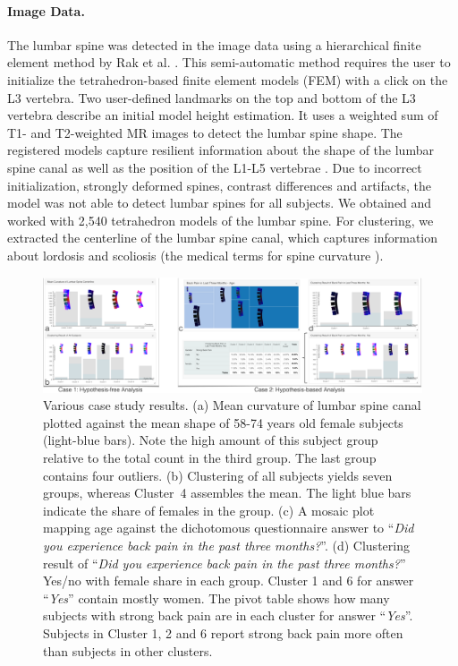 \documentclass[journal]{style/vgtc} 			          %
\begin{document}
\paragraph{Image Data.} \label{Image-Data}
The lumbar spine was detected in the image data using a hierarchical finite element method by Rak et al. \cite{Rak2013}.
%
This semi-automatic method requires the user to initialize the tetrahedron-based finite element models (FEM) with a click on the L3 vertebra.
%
Two user-defined landmarks on the top and bottom of the L3 vertebra describe an initial model height estimation.
%
It uses a weighted sum of T1- and T2-weighted MR images to detect the lumbar spine shape.
%
The registered models capture resilient information about the shape of the lumbar spine canal as well as the position of the L1-L5 vertebrae \cite{Klemm2013VMV}.
%
Due to incorrect initialization, strongly deformed spines, contrast differences and artifacts, the model was not able to detect lumbar spines for all subjects.
%
We obtained and worked with 2,540 tetrahedron models of the lumbar spine.
%
For clustering, we extracted the centerline of the lumbar spine canal, which captures information about lordosis and scoliosis (the medical terms for spine curvature \cite{Klemm2013VMV}).

\begin{figure}[htb]
 \centering
 \includegraphics[width=1\textwidth, resolution=300]{figures/evaluation}
 \caption{Various case study results.
 (a) Mean curvature of lumbar spine canal plotted against the mean shape of 58-74 years old female subjects (light-blue bars).
 Note the high amount of this subject group relative to the total count in the third group. The last group contains four outliers.
 (b) Clustering of all subjects yields seven groups, whereas Cluster~4 assembles the mean. The light blue bars indicate the share of females in the group.
 (c) A mosaic plot mapping age against the dichotomous questionnaire answer to ``\emph{Did you experience back pain in the past three months?}''.
 (d) Clustering result of ``\emph{Did you experience back pain in the past three months?}'' Yes/no with female share in each group. 
 Cluster 1 and 6 for answer ``\emph{Yes}'' contain mostly women.
 The pivot table shows how many subjects with strong back pain are in each cluster for answer ``\emph{Yes}''.
 Subjects in Cluster 1, 2 and 6 report strong back pain more often than subjects in other clusters.
 }
 \label{fig:application}
\end{figure}
\end{document}
